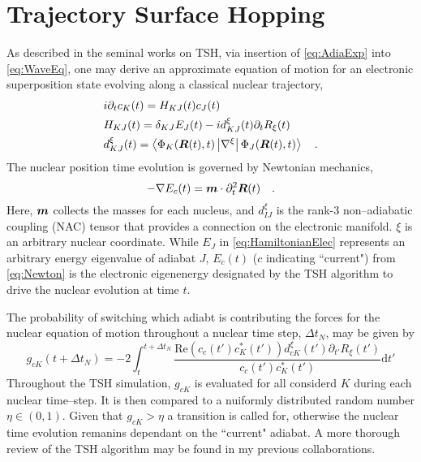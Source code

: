 \section{Trajectory Surface Hopping}
\label{sec:TSH}

As described in the seminal works on TSH\cite{Tully98_407, Tully90_1061}, via
insertion of \cref{eq:AdiaExp} into \cref{eq:WaveEq}, one may derive an
approximate equation of motion for an electronic superposition state evolving
along a classical nuclear trajectory,
\begin{align}
  &i  \partial_t c_K(t) = H_{KJ}(t) c_J(t) \label{eq:EOMCs} \\
  &H_{KJ}(t) = \delta_{KJ}E_J(t) - i d_{KJ}^\xi (t) \partial_t R_{\xi}(t) \label{eq:HamiltonianElec} \\
  &d_{KJ}^\xi (t) = \left\langle \Phi_K(\boldsymbol{R}(t),t) \left\vert \nabla^\xi \right\vert \Phi_J(\boldsymbol{R}(t),t) \right\rangle \label{eq:NAC}
  \quad .
\end{align}
The nuclear position time evolution is governed by Newtonian mechanics,
\begin{equation}
  -\nabla E_c(t) = \boldsymbol{m}\cdot \partial_t^2\boldsymbol{R}(t) \label{eq:Newton}
  \quad.
\end{equation}
Here, $\boldsymbol{m}$ collects the masses for each nucleus, and $d_{IJ}^\xi$ is the
rank-3 non--adiabatic coupling (NAC) tensor that provides a connection on the
electronic manifold.  $\xi$ is an arbitrary nuclear coordinate.  While $E_J$ in
\cref{eq:HamiltonianElec} represents an arbitrary energy eigenvalue of adiabat
$J$, $E_c(t)$ ($c$ indicating ``current") from \cref{eq:Newton} is the
electronic eigenenergy designated by the TSH algorithm to drive the nuclear
evolution at time $t$.  

The probability of switching which adiabt is contributing the forces for the
nuclear equation of motion throughout a nuclear time step, $\Delta t_N$, may be
given by
\begin{equation}
g_{cK}(t + \Delta t_N) = -2 \int_t^{t + \Delta t_N} 
  \frac{\mathrm{Re}(c_c(t') c^*_K(t'))d_{cK}^\xi (t') \partial_{t'}
  R_{\xi}(t')}{c_c(t') c^*_K(t')}\mathrm{d}t'
\end{equation}
Throughout the TSH simulation, $g_{cK}$ is evaluated for all considerd $K$
during each nuclear time--step. It is then compared to a nuiformly distributed
random number $\eta \in (0,1)$. Given that $g_{cK} > \eta$ a transition is
called for, otherwise the nuclear time evolution remanins dependant on the
``current" adiabat. A more thorough review of the TSH algorithm may be found in
my previous collaborations\cite{DBWY16_JCTC935}.

